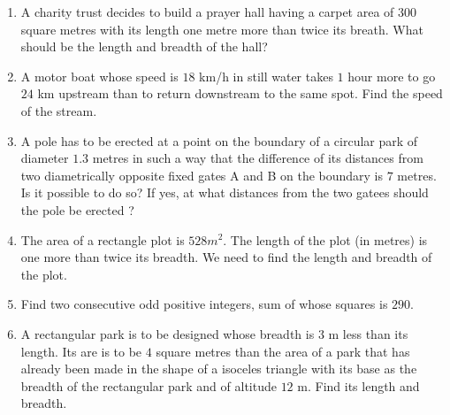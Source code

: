\begin{enumerate}[label=\thesubsection.\arabic*,ref=\thesubsection.\theenumi,resume*]
\item  A charity trust decides to build a prayer hall having a carpet area of 300 square metres with its length one metre more than twice its breath. What should be the length and breadth of the hall?
\item A motor boat whose speed is $18$ km/h in still water takes $1$ hour more to go $24$ km upstream than to return downstream to the same spot. Find the speed of the stream.
\item A pole has to be erected at a point on the boundary of a circular park of diameter $1.3$ metres in such a way that the difference of its distances from two diametrically opposite fixed gates A and B on the boundary is $7$ metres. Is it possible to do so? If yes, at what distances from the two gatees should the pole be erected ?
\item The area of a rectangle plot is $528 m^2$. The length of the plot (in metres) is one more than twice its breadth. We need to find the length and breadth of the plot.
\item Find two consecutive odd positive integers, sum of whose squares is $290$.
\item A rectangular park is to be designed whose breadth is $3$ m less than its length. Its are is to be $4$ square metres than the area of a park that has already been made in the shape of a isoceles triangle with its base as  the breadth of the rectangular park and of altitude $12$ m. Find its length and breadth.
\end{enumerate}
